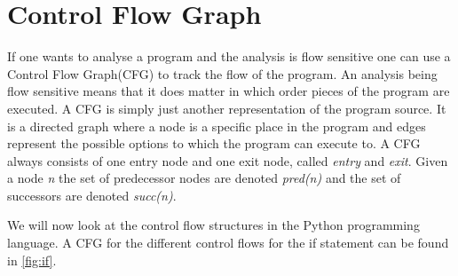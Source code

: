 \section{Control Flow Graph}\label{control_flow_graph}
If one wants to analyse a program and the analysis is flow sensitive one can use a Control Flow Graph(CFG) to track the flow of the program.
An analysis being flow sensitive means that it does matter in which order pieces of the program are executed.
A CFG is simply just another representation of the program source.
It is a directed graph where a node is a specific place in the program and edges represent the possible options to which the program can execute to.
A CFG always consists of one entry node and one exit node, called \textit{entry} and \textit{exit}.
Given a node \textit{n} the set of predecessor nodes are denoted \textit{pred(n)} and the set of successors are denoted \textit{succ(n)}.

We will now look at the control flow structures in the Python programming language.
A CFG for the different control flows for the if statement can be found in \cref{fig:if}.

